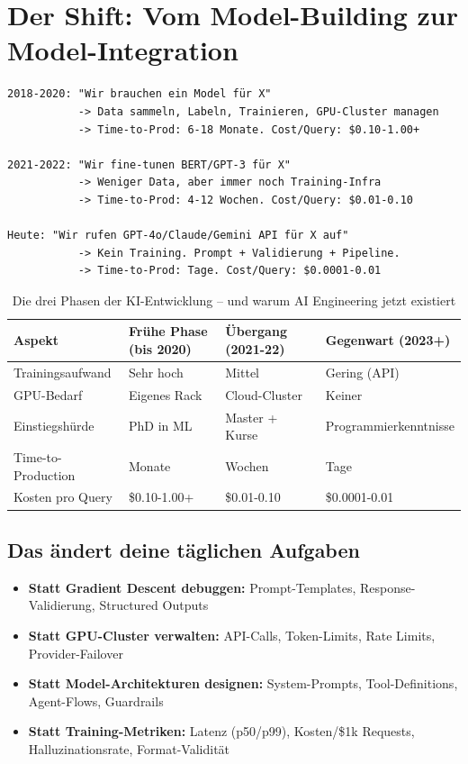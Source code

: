 \section{Der Shift: Vom Model-Building zur Model-Integration}

\begin{verbatim}
2018-2020: "Wir brauchen ein Model für X"
           -> Data sammeln, Labeln, Trainieren, GPU-Cluster managen
           -> Time-to-Prod: 6-18 Monate. Cost/Query: $0.10-1.00+

2021-2022: "Wir fine-tunen BERT/GPT-3 für X"
           -> Weniger Data, aber immer noch Training-Infra
           -> Time-to-Prod: 4-12 Wochen. Cost/Query: $0.01-0.10

Heute: "Wir rufen GPT-4o/Claude/Gemini API für X auf"
           -> Kein Training. Prompt + Validierung + Pipeline.
           -> Time-to-Prod: Tage. Cost/Query: $0.0001-0.01
\end{verbatim}

\begin{table}[H]
\centering
\begin{tabularx}{\linewidth}{lXXX}
\toprule
\textbf{Aspekt} & \textbf{Frühe Phase (bis 2020)} & \textbf{Übergang (2021-22)} & \textbf{Gegenwart (2023+)} \\
\midrule
Trainingsaufwand & Sehr hoch & Mittel & Gering (API) \\
GPU-Bedarf & Eigenes Rack & Cloud-Cluster & Keiner \\
Einstiegshürde & PhD in ML & Master + Kurse & Programmierkenntnisse \\
Time-to-Production & Monate & Wochen & Tage \\
Kosten pro Query & \$0.10-1.00+ & \$0.01-0.10 & \$0.0001-0.01 \\
\bottomrule
\end{tabularx}
\caption{Die drei Phasen der KI-Entwicklung -- und warum AI Engineering jetzt existiert}
\label{tab:ki-phasen}
\end{table}

\subsection*{Das ändert deine täglichen Aufgaben}

\begin{itemize}

    \item \textbf{Statt Gradient Descent debuggen:} Prompt-Templates, Response-Validierung, Structured Outputs
    \item \textbf{Statt GPU-Cluster verwalten:} API-Calls, Token-Limits, Rate Limits, Provider-Failover
    \item \textbf{Statt Model-Architekturen designen:} System-Prompts, Tool-Definitions, Agent-Flows, Guardrails
    \item \textbf{Statt Training-Metriken:} Latenz (p50/p99), Kosten/\$1k Requests, Halluzinationsrate, Format-Validität
\end{itemize}

